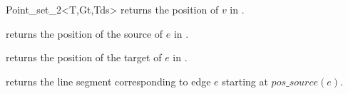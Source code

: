 \begin{ccRefClass}{Point_set_2<T,Gt,Tds>}
{ returns the position of $v$ in \ccVar.}
    
{ returns the position of the source of $e$ in \ccVar.}
   
{ returns the position of the target of $e$ in \ccVar.}
    
{ returns the line segment corresponding to edge $e$ starting
at $pos\_source(e)$.}
   

\ccHtmlLinksOn

\end{ccRefClass} 
